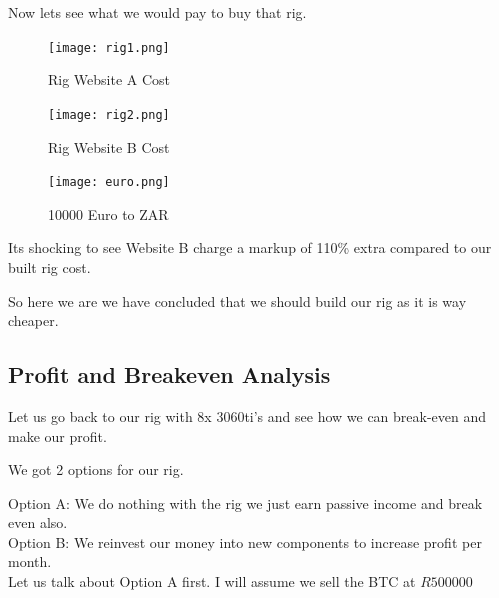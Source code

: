 Now lets see what we would pay to buy that rig.

\begin{figure}[H]
\centering
\texttt{[image: rig1.png]}
\caption{Rig Website A Cost}
\label{fig:rigcost}
\end{figure}

\begin{figure}[H]
\centering
\texttt{[image: rig2.png]}
\caption{Rig Website B Cost}
\label{fig:rigcost2}
\end{figure}

\begin{figure}[H]
\centering
\texttt{[image: euro.png]}
\caption{10000 Euro to ZAR}
\label{fig:rigcost3}
\end{figure}


Its shocking to see Website B charge a markup of 110\% extra compared to our built rig cost.

So here we are we have concluded that we should build our rig as it is way cheaper.

\subsection{Profit and Breakeven Analysis}

Let us go back to our rig with 8x 3060ti's and see how we can break-even and make our profit.

We got 2 options for our rig.

Option A: We do nothing with the rig we just earn passive income and break even also. \\
Option B: We reinvest our money into new components to increase profit per month. \\

Let us talk about Option A first. I will assume we sell the BTC at $R500000$ \\

